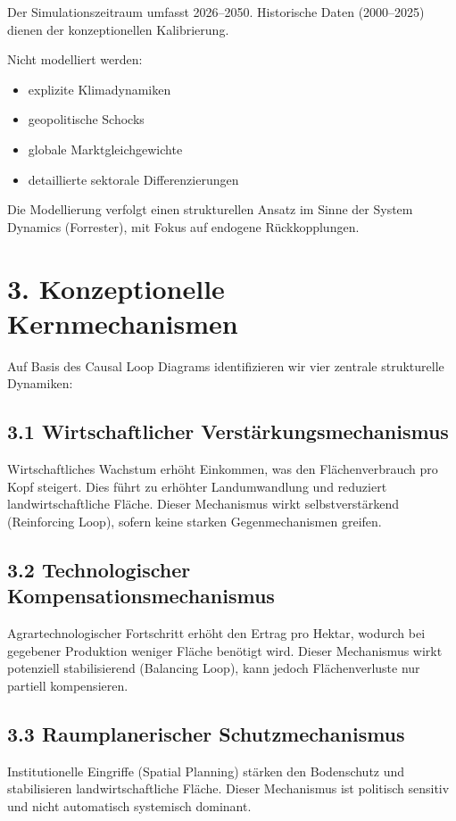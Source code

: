 \documentclass[10pt, a4paper]{article}
\begin{document}
Der Simulationszeitraum umfasst 2026–2050. Historische Daten (2000–2025) dienen der konzeptionellen Kalibrierung.

Nicht modelliert werden:
\begin{itemize}[itemsep=0pt, leftmargin=*]
    \item explizite Klimadynamiken
    \item geopolitische Schocks
    \item globale Marktgleichgewichte
    \item detaillierte sektorale Differenzierungen
\end{itemize}

Die Modellierung verfolgt einen strukturellen Ansatz im Sinne der System Dynamics (Forrester), mit Fokus auf endogene Rückkopplungen.

\section*{3. Konzeptionelle Kernmechanismen}
Auf Basis des Causal Loop Diagrams identifizieren wir vier zentrale strukturelle Dynamiken:

\subsection*{3.1 Wirtschaftlicher Verstärkungsmechanismus}
Wirtschaftliches Wachstum erhöht Einkommen, was den Flächenverbrauch pro Kopf steigert. Dies führt zu erhöhter Landumwandlung und reduziert landwirtschaftliche Fläche. Dieser Mechanismus wirkt selbstverstärkend (Reinforcing Loop), sofern keine starken Gegenmechanismen greifen.

\subsection*{3.2 Technologischer Kompensationsmechanismus}
Agrartechnologischer Fortschritt erhöht den Ertrag pro Hektar, wodurch bei gegebener Produktion weniger Fläche benötigt wird. Dieser Mechanismus wirkt potenziell stabilisierend (Balancing Loop), kann jedoch Flächenverluste nur partiell kompensieren.

\subsection*{3.3 Raumplanerischer Schutzmechanismus}
Institutionelle Eingriffe (Spatial Planning) stärken den Bodenschutz und stabilisieren landwirtschaftliche Fläche. Dieser Mechanismus ist politisch sensitiv und nicht automatisch systemisch dominant.
\end{document}
